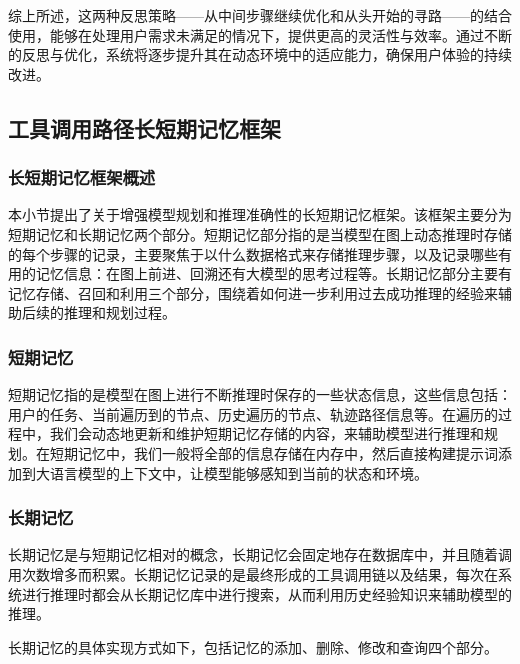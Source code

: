 综上所述，这两种反思策略——从中间步骤继续优化和从头开始的寻路——的结合使用，能够在处理用户需求未满足的情况下，提供更高的灵活性与效率。通过不断的反思与优化，系统将逐步提升其在动态环境中的适应能力，确保用户体验的持续改进。

\subsection{工具调用路径长短期记忆框架}

\subsubsection{长短期记忆框架概述}

本小节提出了关于增强模型规划和推理准确性的长短期记忆框架。该框架主要分为短期记忆和长期记忆两个部分。短期记忆部分指的是当模型在图上动态推理时存储的每个步骤的记录，主要聚焦于以什么数据格式来存储推理步骤，以及记录哪些有用的记忆信息：在图上前进、回溯还有大模型的思考过程等。长期记忆部分主要有记忆存储、召回和利用三个部分，围绕着如何进一步利用过去成功推理的经验来辅助后续的推理和规划过程。

\subsubsection{短期记忆}

短期记忆指的是模型在图上进行不断推理时保存的一些状态信息，这些信息包括：用户的任务、当前遍历到的节点、历史遍历的节点、轨迹路径信息等。在遍历的过程中，我们会动态地更新和维护短期记忆存储的内容，来辅助模型进行推理和规划。在短期记忆中，我们一般将全部的信息存储在内存中，然后直接构建提示词添加到大语言模型的上下文中，让模型能够感知到当前的状态和环境。

\subsubsection{长期记忆}

长期记忆是与短期记忆相对的概念，长期记忆会固定地存在数据库中，并且随着调用次数增多而积累。长期记忆记录的是最终形成的工具调用链以及结果，每次在系统进行推理时都会从长期记忆库中进行搜索，从而利用历史经验知识来辅助模型的推理。

长期记忆的具体实现方式如下，包括记忆的添加、删除、修改和查询四个部分。

